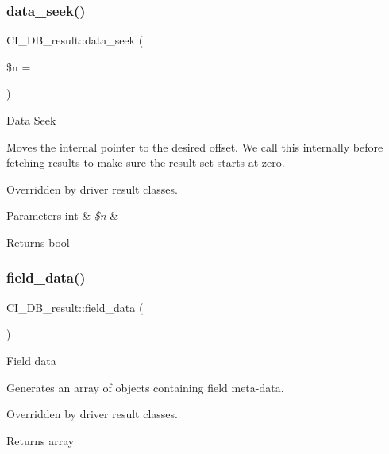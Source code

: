 \subsubsection{\texorpdfstring{data\+\_\+seek()}{data\_seek()}}
{\footnotesize\ttfamily C\+I\+\_\+\+D\+B\+\_\+result\+::data\+\_\+seek (\begin{DoxyParamCaption}\item[{}]{\$n = {} }\end{DoxyParamCaption})}

Data Seek

Moves the internal pointer to the desired offset. We call this internally before fetching results to make sure the result set starts at zero.

Overridden by driver result classes.


\begin{DoxyParams}[1]{Parameters}
int & {\em \$n} & \\
\hline
\end{DoxyParams}
\begin{DoxyReturn}{Returns}
bool 
\end{DoxyReturn}
\mbox{\label{class_c_i___d_b__result_aae5122760c167b25c891512b026e5d95}} 
\subsubsection{\texorpdfstring{field\+\_\+data()}{field\_data()}}
{\footnotesize\ttfamily C\+I\+\_\+\+D\+B\+\_\+result\+::field\+\_\+data (\begin{DoxyParamCaption}{ }\end{DoxyParamCaption})}

Field data

Generates an array of objects containing field meta-\/data.

Overridden by driver result classes.

\begin{DoxyReturn}{Returns}
array 
\end{DoxyReturn}
\mbox{\label{class_c_i___d_b__result_ab416a868422b74af51d500b63b3e59f7}} 
